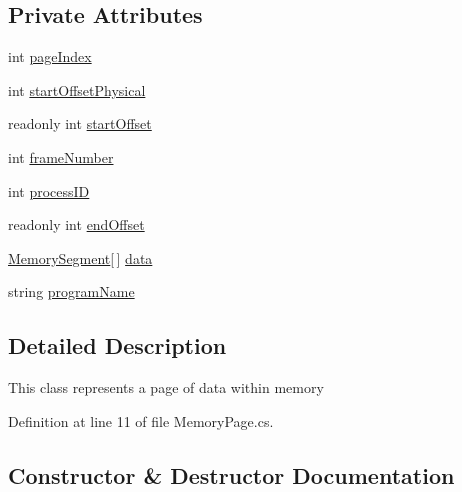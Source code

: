 \subsection*{Private Attributes}
\begin{DoxyCompactItemize}
\item 
int \hyperlink{class_c_p_u___o_s___simulator_1_1_memory_1_1_memory_page_acf60a7bdefab6120fe080854b5f0b38b}{page\+Index}
\item 
int \hyperlink{class_c_p_u___o_s___simulator_1_1_memory_1_1_memory_page_a3cecfb0fe2f91def3db5711180442d44}{start\+Offset\+Physical}
\item 
readonly int \hyperlink{class_c_p_u___o_s___simulator_1_1_memory_1_1_memory_page_a6fe2e28385db19a1968a41efe3df3f38}{start\+Offset}
\item 
int \hyperlink{class_c_p_u___o_s___simulator_1_1_memory_1_1_memory_page_aa2201f66e00641ff4eb07f881ac5413f}{frame\+Number}
\item 
int \hyperlink{class_c_p_u___o_s___simulator_1_1_memory_1_1_memory_page_a9fbfaef488c3267b6db79d40e6ae521b}{process\+I\+D}
\item 
readonly int \hyperlink{class_c_p_u___o_s___simulator_1_1_memory_1_1_memory_page_ae2f8f419909326ce5449d37af9ff7c89}{end\+Offset}
\item 
\hyperlink{class_c_p_u___o_s___simulator_1_1_memory_1_1_memory_segment}{Memory\+Segment}\mbox{[}$\,$\mbox{]} \hyperlink{class_c_p_u___o_s___simulator_1_1_memory_1_1_memory_page_af9ab25101e7920de2344e0fa5ddfaa27}{data}
\item 
string \hyperlink{class_c_p_u___o_s___simulator_1_1_memory_1_1_memory_page_a0607c69f1f03e6c8b63186e0b0f13c3c}{program\+Name}
\end{DoxyCompactItemize}


\subsection{Detailed Description}
This class represents a page of data within memory 



Definition at line 11 of file Memory\+Page.\+cs.



\subsection{Constructor \& Destructor Documentation}
\hypertarget{class_c_p_u___o_s___simulator_1_1_memory_1_1_memory_page_a5befa10c152f468ca7b14157e87a5bd5}{}
